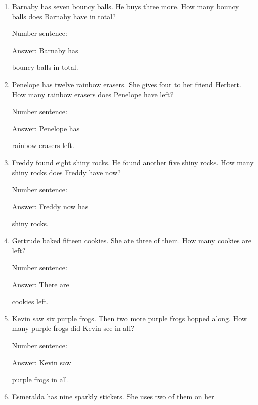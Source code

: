 \documentclass{tufte-book}
\begin{document}
\begin{enumerate}

\item
  Barnaby has seven bouncy balls. He buys three more. How many bouncy
  balls does Barnaby have in total?\medskip\par
  Number sentence:
  \dotfill\medskip\par
  Answer: Barnaby has
  \dotfill\medskip\par\mbox{}\dotfill\medskip\par\mbox{}\dotfill\bigskip
  bouncy balls in total.
\item
  Penelope has twelve rainbow erasers. She gives four to her friend
  Herbert. How many rainbow erasers does Penelope have left?\medskip\par
  Number sentence:
  \dotfill\medskip\par
  Answer: Penelope has
  \dotfill\medskip\par\mbox{}\dotfill\medskip\par\mbox{}\dotfill\bigskip
  rainbow erasers left.
\item
  Freddy found eight shiny rocks. He found another five shiny rocks. How
  many shiny rocks does Freddy have now?\medskip\par
  Number sentence:
  \dotfill\medskip\par
  Answer: Freddy now has
  \dotfill\medskip\par\mbox{}\dotfill\medskip\par\mbox{}\dotfill\bigskip
  shiny rocks.
\item
  Gertrude baked fifteen cookies. She ate three of them. How many
  cookies are left?\medskip\par
  Number sentence:
  \dotfill\medskip\par
  Answer: There are
  \dotfill\medskip\par\mbox{}\dotfill\medskip\par\mbox{}\dotfill\bigskip
  cookies left.
\item
  Kevin saw six purple frogs. Then two more purple frogs hopped along.
  How many purple frogs did Kevin see in all?\medskip\par
  Number sentence:
  \dotfill\medskip\par
  Answer: Kevin saw
  \dotfill\medskip\par\mbox{}\dotfill\medskip\par\mbox{}\dotfill\bigskip
  purple frogs in all.
\item
  Esmeralda has nine sparkly stickers. She uses two of them on her

\end{enumerate}
\end{document}
